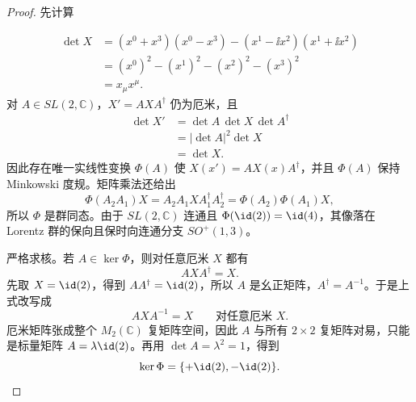 \begin{proof}
先计算

\begin{align*}
 \det X
 &=(x^0+x^3)(x^0-x^3)
 -(x^1-\ii x^2)(x^1+\ii x^2)\\
 &=(x^0)^2-(x^1)^2-(x^2)^2-(x^3)^2\\
 &=x_\mu x^\mu.
\end{align*}
对 $A\in SL(2,\mathbb C)$，$X'=AXA^\dagger$ 仍为厄米，且
\begin{align*}
 \det X'
 &=\det A\,\det X\,\det A^\dagger\\
 &=|\det A|^2\det X\\
 &=\det X.
\end{align*}
因此存在唯一实线性变换 $\Phi(A)$ 使 $X(x')=AX(x)A^\dagger$，并且 $\Phi(A)$ 保持 Minkowski 度规。矩阵乘法还给出
\begin{equation*}
 \Phi(A_2A_1)X
 =A_2A_1X A_1^\dagger A_2^\dagger
 =\Phi(A_2)\Phi(A_1)X,
\end{equation*}
所以 $\Phi$ 是群同态。由于 $SL(2,\mathbb C)$ 连通且 $\Phi(\id(2))=\id(4)$，其像落在 Lorentz 群的保向且保时向连通分支 $SO^+(1,3)$。

严格求核。若 $A\in\ker\Phi$，则对任意厄米 $X$ 都有
\begin{equation*}
 AXA^\dagger=X.
\end{equation*}
先取 $X=\id(2)$，得到 $AA^\dagger=\id(2)$，所以 $A$ 是幺正矩阵，$A^\dagger=A^{-1}$。于是上式改写成
\begin{equation*}
 AXA^{-1}=X
 \qquad\text{对任意厄米 }X.
\end{equation*}
厄米矩阵张成整个 $M_2(\mathbb C)$ 复矩阵空间，因此 $A$ 与所有 $2\times2$ 复矩阵对易，只能是标量矩阵 $A=\lambda\id(2)$。再用 $\det A=\lambda^2=1$，得到
\begin{equation*}
 \ker\Phi=\{+\id(2),-\id(2)\}.
\end{equation*}


\end{proof}
